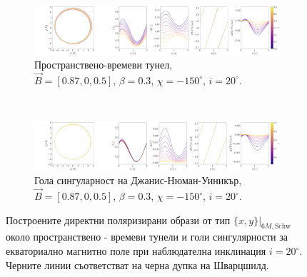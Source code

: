 \documentclass[12pt]{article}
\numberwithin{equation}{section}
\numberwithin{figure}{section}
\begin{document}
	\begin{figure}[!htb]
		\begin{subfigure}{16cm}
			\hspace{-1.0em}
			\includegraphics[scale = 0.15]{Section_7_Polarized_Emission/WH_delta_fig_B_0.87_0.5_0_20_deg_r6.png}
			\caption{Пространствено-времеви тунел,\\ $\vec{B} = [0.87, 0, 0.5]$, $\beta = 0.3$, $\chi = -150^\circ$, $i = 20^\circ$.} 
		\end{subfigure}\\
		\begin{subfigure}{17cm}
			\hspace{-1em}
			\includegraphics[scale = 0.15]{Section_7_Polarized_Emission/JNW_delta_figs_B_0.87_0.0_0.5_20_deg_direct.png}
			\caption{Гола сингуларност на Джанис-Нюман-Уиникър,\\  $\vec{B} = [0.87, 0, 0.5]$, $\beta = 0.3$, $\chi = -150^\circ$, $i = 20^\circ$.}
		\end{subfigure}
		\caption[Поляризирани директни образи от тип $\{x,y\}\vert_{6M, \text{Schw}}$ около пространствено - времеви тунели и голи сингулярности за екваториално магнитно поле при $i = 20^\circ$.]{\small Построените директни поляризирани образи от тип $\{x,y\}\vert_{6M, \text{Schw}}$ около пространствено - времеви тунели  и голи сингулярности за екваториално магнитно поле при наблюдателна инклинация $i = 20^\circ$. Черните линии съответстват на черна дупка на Шварцшилд.} 
		\label{Direct_image_deltas_20}
	\end{figure}
	
\end{document}
